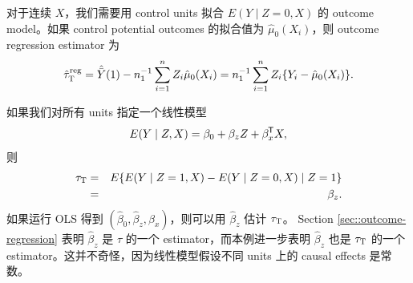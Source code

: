 对于连续 $X$，我们需要用 control units 拟合 $E(Y\mid Z=0, X)$ 的 outcome model。如果 control potential outcomes 的拟合值为 $\hat{\mu}_0(X_i)$，则 outcome regression estimator 为
$$
\hat{\tau}_\textsc{T}^\text{reg} =  \hat{\bar{Y}}(1) - n_1^{-1} \sum_{i=1}^n Z_i \hat{\mu}_0(X_i) = n_1^{-1} \sum_{i=1}^n Z_i  \{  Y_i - \hat{\mu}_0(X_i)  \}. 
$$


\begin{example}\label{eg::att-regression1}
如果我们对所有 units 指定一个线性模型
$$
E(Y\mid Z, X) = \beta_0  + \beta_z  Z + \beta_x^{\mkern-1.5mu\mathsf{T}} X,
$$
则
\begin{eqnarray*}
\tau_\textsc{T} &=& E\{   E(Y\mid Z=1, X)  -  E(    Y \mid Z=0 , X)  \mid Z=1\} \\
&=&  \beta_z.
\end{eqnarray*}
如果运行 OLS 得到 $( \hat{\beta}_0, \hat{\beta}_z,  \hat{\beta}_x )$，则可以用 $\hat{\beta}_z$ 估计 $\tau_\textsc{T} $。
%
%
Section \ref{sec::outcome-regression} 表明 $\hat{\beta}_z$ 是 $\tau$ 的一个 estimator，而本例进一步表明 $\hat{\beta}_z$ 也是 $\tau_\textsc{T}$ 的一个 estimator。这并不奇怪，因为线性模型假设不同 units 上的 causal effects 是常数。
\end{example}


